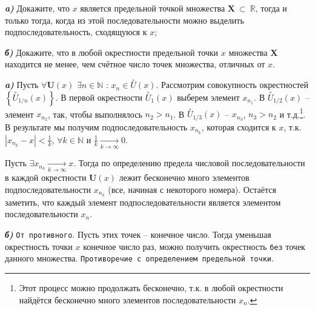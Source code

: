 \documentclass[10pt]{article}
\begin{document}
\begin{problem}
\emph{\textbf{a)}} Докажите, что $x$ является предельной точкой множества $\textbf{X}~\!\subset~\!\mathbb{R}$, тогда и только тогда, когда из этой последовательности можно выделить подпоследовательность, сходящуюся к $x$;

\medskip

\emph{\textbf{б)}} Докажите, что в любой окрестности предельной точки $x$ множества $\textbf{X}$ находится не менее, чем счётное число точек множества, отличных от $x$.
\end{problem}
\begin{solution}
\emph{\textbf{a)}} Пусть
\marginnote{\footnotesize{{$\Longrightarrow$}}}
$\forall \mathbf{U}(x)$ $\exists n \in \mathbb{N}$ : $x_n \in \stackrel{\circ}{U}\!\!(x)$. Рассмотрим совокупность окрестностей $\left\{\stackrel{\circ}{U}_{1/n}\!\!(x)\right\}$. В первой окрестности $\stackrel{\circ}{U}_{1}\!\!(x)$ выберем элемент $x_{n_1}$. В  $\stackrel{\circ}{U}_{1/2}\!\!(x)$ -- элемент $x_{n_2}$, так, чтобы выполнялось $n_2 > n_1$. В $\stackrel{\circ}{U}_{1/3}\!\!(x)$ -- $x_{n_3}$, $n_3 > n_2$ и т.д.\footnote{Этот процесс можно продолжать бесконечно, т.к. в любой окрестности найдётся бесконечно много элементов последовательности $x_n$.}. В результате мы получим подпоследовательность $x_{n_k}$, %
которая сходится к $x$, т.к.~$|x_{n_k}-x|<\frac1k$, $\forall k \in \mathbb{N}$ и $\frac1k \xrightarrow[k \to \infty]{} 0$.

\medskip

Пусть
\marginnote{\footnotesize{{$\Longleftarrow$}}}
$\exists x_{n_k} \xrightarrow[k \to \infty]{}x$. Тогда по определению предела числовой последовательности в каждой окрестности $\mathbf{U}(x)$ лежит бесконечно много элементов подпоследовательности $x_{n_k}$ (все, начиная с некоторого номера). Остаётся заметить, что каждый элемент подпоследовательности является элементом последовательности $x_{n}$.

\medskip

\emph{\textbf{б)}} \texttt{От противного}. Пусть этих точек -- конечное число. Тогда уменьшая окрестность точки $x$ конечное число раз, можно получить окрестность \texttt{без} точек данного множества. \texttt{Противоречие с определением предельной точки}.
\end{solution}
\end{document}
